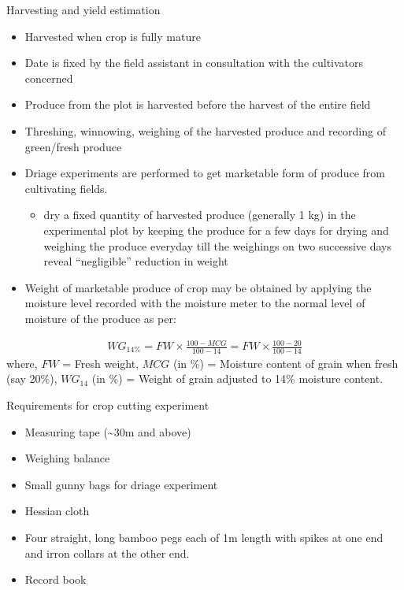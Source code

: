 \documentclass[11pt,dvipsnames,ignorenonframetext,aspectratio=169]{beamer}
\providecommand{\tightlist}{%
  \setlength{\itemsep}{0pt}\setlength{\parskip}{0pt}}
\begin{document}
\begin{frame}{Harvesting and yield estimation}
\protect\hypertarget{harvesting-and-yield-estimation}{}
\begin{itemize}
\tightlist
\item
  Harvested when crop is fully mature
\item
  Date is fixed by the field assistant in consultation with the
  cultivators concerned
\item
  Produce from the plot is harvested before the harvest of the entire
  field
\item
  Threshing, winnowing, weighing of the harvested produce and recording
  of green/fresh produce
\item
  Driage experiments are performed to get marketable form of produce
  from cultivating fields.

  \begin{itemize}
  \tightlist
  \item
    dry a fixed quantity of harvested produce (generally 1 kg) in the
    experimental plot by keeping the produce for a few days for drying
    and weighing the produce everyday till the weighings on two
    successive days reveal ``negligible'' reduction in weight
  \end{itemize}
\end{itemize}
\end{frame}

\begin{frame}{}
\protect\hypertarget{section-1}{}
\begin{itemize}
\tightlist
\item
  Weight of marketable produce of crop may be obtained by applying the
  moisture level recorded with the moisture meter to the normal level of
  moisture of the produce as per:
\end{itemize}

\[
\begin{aligned}
WG_{14\%} = FW \times \frac{100-MCG}{100-14} = FW \times \frac{100-20}{100-14}
\end{aligned}
\] where, \(FW\) = Fresh weight, \(MCG\) (in \%) = Moisture content of
grain when fresh (say 20\%), \(WG_{14}\) (in \%) = Weight of grain
adjusted to 14\% moisture content.
\end{frame}

\begin{frame}{Requirements for crop cutting experiment}
\protect\hypertarget{requirements-for-crop-cutting-experiment}{}
\begin{itemize}
\tightlist
\item
  Measuring tape (\textasciitilde30m and above)
\item
  Weighing balance
\item
  Small gunny bags for driage experiment
\item
  Hessian cloth
\item
  Four straight, long bamboo pegs each of 1m length with spikes at one
  end and irron collars at the other end.
\item
  Record book
\end{itemize}
\end{frame}
\end{document}
